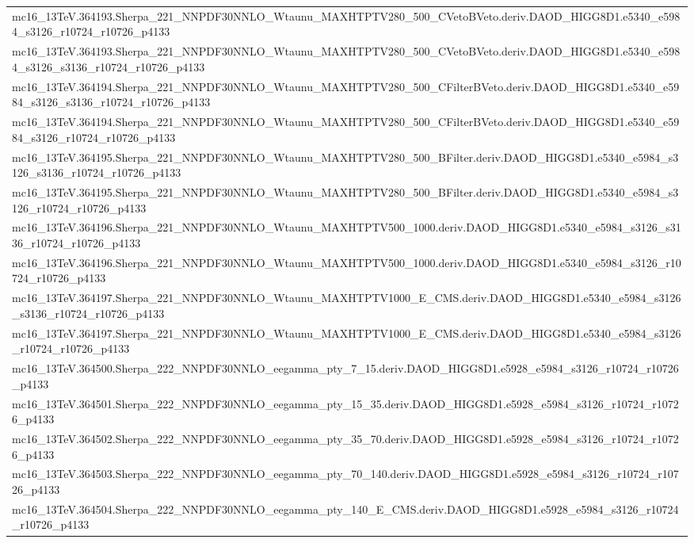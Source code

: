 \begin{adjustwidth}{-3em}{-3em}
\begin{longtable}{l}
mc16\_13TeV.364193.Sherpa\_221\_NNPDF30NNLO\_Wtaunu\_MAXHTPTV280\_500\_CVetoBVeto.deriv.DAOD\_HIGG8D1.e5340\_e5984\_s3126\_r10724\_r10726\_p4133 \\
mc16\_13TeV.364193.Sherpa\_221\_NNPDF30NNLO\_Wtaunu\_MAXHTPTV280\_500\_CVetoBVeto.deriv.DAOD\_HIGG8D1.e5340\_e5984\_s3126\_s3136\_r10724\_r10726\_p4133 \\
mc16\_13TeV.364194.Sherpa\_221\_NNPDF30NNLO\_Wtaunu\_MAXHTPTV280\_500\_CFilterBVeto.deriv.DAOD\_HIGG8D1.e5340\_e5984\_s3126\_s3136\_r10724\_r10726\_p4133 \\
mc16\_13TeV.364194.Sherpa\_221\_NNPDF30NNLO\_Wtaunu\_MAXHTPTV280\_500\_CFilterBVeto.deriv.DAOD\_HIGG8D1.e5340\_e5984\_s3126\_r10724\_r10726\_p4133 \\
mc16\_13TeV.364195.Sherpa\_221\_NNPDF30NNLO\_Wtaunu\_MAXHTPTV280\_500\_BFilter.deriv.DAOD\_HIGG8D1.e5340\_e5984\_s3126\_s3136\_r10724\_r10726\_p4133 \\
mc16\_13TeV.364195.Sherpa\_221\_NNPDF30NNLO\_Wtaunu\_MAXHTPTV280\_500\_BFilter.deriv.DAOD\_HIGG8D1.e5340\_e5984\_s3126\_r10724\_r10726\_p4133 \\
mc16\_13TeV.364196.Sherpa\_221\_NNPDF30NNLO\_Wtaunu\_MAXHTPTV500\_1000.deriv.DAOD\_HIGG8D1.e5340\_e5984\_s3126\_s3136\_r10724\_r10726\_p4133 \\
mc16\_13TeV.364196.Sherpa\_221\_NNPDF30NNLO\_Wtaunu\_MAXHTPTV500\_1000.deriv.DAOD\_HIGG8D1.e5340\_e5984\_s3126\_r10724\_r10726\_p4133 \\
mc16\_13TeV.364197.Sherpa\_221\_NNPDF30NNLO\_Wtaunu\_MAXHTPTV1000\_E\_CMS.deriv.DAOD\_HIGG8D1.e5340\_e5984\_s3126\_s3136\_r10724\_r10726\_p4133 \\
mc16\_13TeV.364197.Sherpa\_221\_NNPDF30NNLO\_Wtaunu\_MAXHTPTV1000\_E\_CMS.deriv.DAOD\_HIGG8D1.e5340\_e5984\_s3126\_r10724\_r10726\_p4133 \\
mc16\_13TeV.364500.Sherpa\_222\_NNPDF30NNLO\_eegamma\_pty\_7\_15.deriv.DAOD\_HIGG8D1.e5928\_e5984\_s3126\_r10724\_r10726\_p4133 \\
mc16\_13TeV.364501.Sherpa\_222\_NNPDF30NNLO\_eegamma\_pty\_15\_35.deriv.DAOD\_HIGG8D1.e5928\_e5984\_s3126\_r10724\_r10726\_p4133 \\
mc16\_13TeV.364502.Sherpa\_222\_NNPDF30NNLO\_eegamma\_pty\_35\_70.deriv.DAOD\_HIGG8D1.e5928\_e5984\_s3126\_r10724\_r10726\_p4133 \\
mc16\_13TeV.364503.Sherpa\_222\_NNPDF30NNLO\_eegamma\_pty\_70\_140.deriv.DAOD\_HIGG8D1.e5928\_e5984\_s3126\_r10724\_r10726\_p4133 \\
mc16\_13TeV.364504.Sherpa\_222\_NNPDF30NNLO\_eegamma\_pty\_140\_E\_CMS.deriv.DAOD\_HIGG8D1.e5928\_e5984\_s3126\_r10724\_r10726\_p4133 \\

\end{longtable}
\end{adjustwidth}
